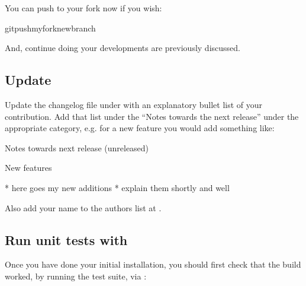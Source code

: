 \documentclass[letterpaper,10pt,english,openany,oneside]{sphinxmanual}
\begin{document}
\sphinxAtStartPar
You can push to your fork now if you wish:

\begin{sphinxVerbatim}[commandchars=\\\{\}]
gitpushmyforknew\PYGZus{}branch
\end{sphinxVerbatim}

\sphinxAtStartPar
And, continue doing your developments are previously discussed.


\subsection{Update }
\label{\detokenize{docs/guide-chapter-contributing:update-news-rst}}
\sphinxAtStartPar
Update the changelog file under  with an explanatory
bullet list of your contribution. Add that list under the “Notes
towards the next release” under the appropriate category, e.g. for a
new feature you would add something like:

\begin{sphinxVerbatim}[commandchars=\\\{\}]
Notes towards next release
\PYGZhy{}\PYGZhy{}\PYGZhy{}\PYGZhy{}\PYGZhy{}\PYGZhy{}\PYGZhy{}\PYGZhy{}\PYGZhy{}\PYGZhy{}\PYGZhy{}\PYGZhy{}\PYGZhy{}\PYGZhy{}\PYGZhy{}\PYGZhy{}\PYGZhy{}\PYGZhy{}\PYGZhy{}\PYGZhy{}\PYGZhy{}\PYGZhy{}\PYGZhy{}\PYGZhy{}\PYGZhy{}\PYGZhy{}
(unreleased)

New features
\PYGZca{}\PYGZca{}\PYGZca{}\PYGZca{}\PYGZca{}\PYGZca{}\PYGZca{}\PYGZca{}\PYGZca{}\PYGZca{}\PYGZca{}\PYGZca{}

* here goes my new additions
* explain them shortly and well
\end{sphinxVerbatim}

\sphinxAtStartPar
Also add your name to the authors list at .


\subsection{Run unit tests with }
\label{\detokenize{docs/guide-chapter-contributing:run-unit-tests-with-pytest}}
\sphinxAtStartPar
Once you have done your initial installation, you should first check
that the build worked, by running the test suite, via :
\end{document}
